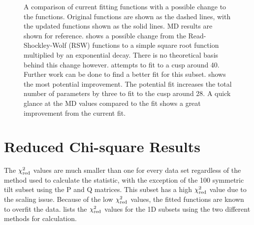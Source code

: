\documentclass[twoside,senior]{BYUPhys}
\begin{document}
\begin{figure}[ht!]
 
 \caption[Possible changes to fitting functions for the 1D twist subsets.]{\label{fig:updatedGraphs} A comparison of current fitting functions with a possible change to the functions.  Original functions are shown as the dashed lines, with the updated functions shown as the solid lines.  MD results are shown for reference. \protect{} shows a possible change from the Read-Shockley-Wolf (RSW) functions to a simple square root function multiplied by an exponential decay.  There is no theoretical basis behind this change however. \protect{} attempts to fit to a cusp around 40\textdegree{}.  Further work can be done to find a better fit for this subset. \protect{} shows the most potential improvement.  The potential fit increases the total number of parameters by three to fit to the cusp around 28\textdegree.  A quick glance at the MD values compared to the fit shows a great improvement from the current fit.}
 
\end{figure}

\section{Reduced Chi-square Results\label{results:chi2red}}
The $\chi_{\textnormal{red}}^2$ values are much smaller than one for every data set regardless of the method used to calculate the statistic, with the exception of the \textlangle{}100\textrangle{} symmetric tilt subset using the P and Q matrices.  This subset has a high $\chi_{\textnormal{red}}^2$ value due to the scaling issue.  Because of the low $\chi_{\textnormal{red}}^2$ values, the fitted functions are known to overfit the data.\cite{bevington2003}   lists the $\chi_{\textnormal{red}}^2$ values for the 1D subsets using the two different methods for calculation. 
\end{document}
